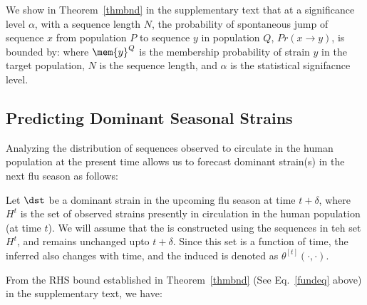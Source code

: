 {We show in Theorem~\ref{thmbnd} in the supplementary text that at a significance level $\alpha$, with a sequence length $N$, the probability of spontaneous jump of sequence $x$ from population $P$ to sequence $y$ in population $Q$, $Pr(x \rightarrow y)$, is bounded by:
where $\mem{y}^Q$ is the membership probability of strain $y$ in the target population, $N$ is the sequence length, and $\alpha$ is the statistical signifacnce level.


\subsection*{Predicting Dominant Seasonal Strains} 

Analyzing the distribution of sequences observed to circulate in the human population at the present time allows us to forecast dominant strain(s) in the next flu season as follows:

Let $\dst$ be a dominant strain in the upcoming flu season at time $t+\delta$,
where $H^t$ is the set of observed strains presently in circulation in the human population (at time $t$). We will assume that the \tnet is constructed using the sequences in teh set $H^t$, and remains unchanged upto $t+\delta$. Since this set is a function of time, the inferred \tnet also changes with time, and the induced \qdist is denoted as $\theta^{[t]}(\cdot,\cdot)$.

From the RHS bound established in Theorem~\ref{thmbnd} (See Eq.~\eqref{fundeq} above) in the supplementary text, we have:
%
%
%
}
